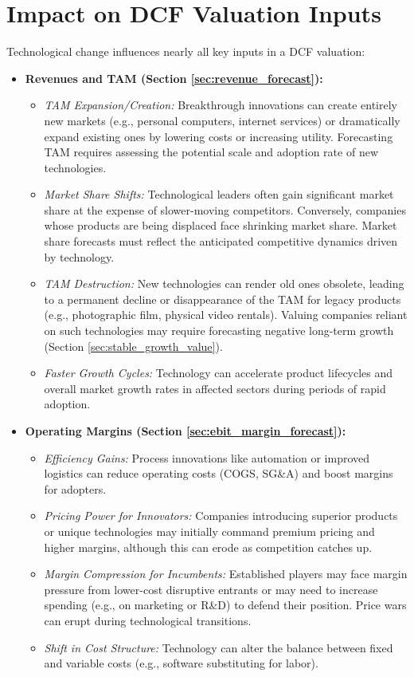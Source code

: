 \section{Impact on DCF Valuation Inputs}

Technological change influences nearly all key inputs in a DCF valuation:

\begin{itemize}
    \item \textbf{Revenues and TAM (Section \ref{sec:revenue_forecast}):}
          \begin{itemize}
              \item \textit{TAM Expansion/Creation:} Breakthrough innovations can create entirely new markets (e.g., personal computers, internet services) or dramatically expand existing ones by lowering costs or increasing utility. Forecasting TAM requires assessing the potential scale and adoption rate of new technologies.
              \item \textit{Market Share Shifts:} Technological leaders often gain significant market share at the expense of slower-moving competitors. Conversely, companies whose products are being displaced face shrinking market share. Market share forecasts must reflect the anticipated competitive dynamics driven by technology.
              \item \textit{TAM Destruction:} New technologies can render old ones obsolete, leading to a permanent decline or disappearance of the TAM for legacy products (e.g., photographic film, physical video rentals). Valuing companies reliant on such technologies may require forecasting negative long-term growth (Section \ref{sec:stable_growth_value}).
              \item \textit{Faster Growth Cycles:} Technology can accelerate product lifecycles and overall market growth rates in affected sectors during periods of rapid adoption.
          \end{itemize}

    \item \textbf{Operating Margins (Section \ref{sec:ebit_margin_forecast}):}
          \begin{itemize}
              \item \textit{Efficiency Gains:} Process innovations like automation or improved logistics can reduce operating costs (COGS, SG\&A) and boost margins for adopters.
              \item \textit{Pricing Power for Innovators:} Companies introducing superior products or unique technologies may initially command premium pricing and higher margins, although this can erode as competition catches up.
              \item \textit{Margin Compression for Incumbents:} Established players may face margin pressure from lower-cost disruptive entrants or may need to increase spending (e.g., on marketing or R\&D) to defend their position. Price wars can erupt during technological transitions.
              \item \textit{Shift in Cost Structure:} Technology can alter the balance between fixed and variable costs (e.g., software substituting for labor).
          \end{itemize}


\end{itemize}
